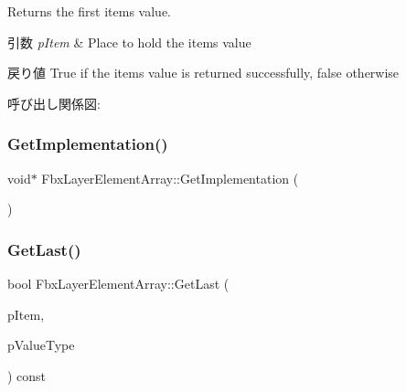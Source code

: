 Returns the first item\textquotesingle{}s value. 
\begin{DoxyParams}{引数}
{\em p\+Item} & Place to hold the item\textquotesingle{}s value \\
\hline
\end{DoxyParams}
\begin{DoxyReturn}{戻り値}
{\ttfamily True} if the item\textquotesingle{}s value is returned successfully, {\ttfamily false} otherwise 
\end{DoxyReturn}
呼び出し関係図\+:
\mbox{\label{class_fbx_layer_element_array_a3b8b773d91de7b18941884a208f90470}} 
\subsubsection{\texorpdfstring{Get\+Implementation()}{GetImplementation()}}
{\footnotesize\ttfamily void$\ast$ Fbx\+Layer\+Element\+Array\+::\+Get\+Implementation (\begin{DoxyParamCaption}{ }\end{DoxyParamCaption})\hspace{0.3cm}{\ttfamily [protected]}}

\mbox{\label{class_fbx_layer_element_array_a67aeb0dde8b3535d83dcf9eab97e78ae}} 
\subsubsection{\texorpdfstring{Get\+Last()}{GetLast()}\hspace{0.1cm}{\footnotesize\ttfamily [1/2]}}
{\footnotesize\ttfamily bool Fbx\+Layer\+Element\+Array\+::\+Get\+Last (\begin{DoxyParamCaption}\item[{void $\ast$$\ast$}]{p\+Item,  }\item[{\hyperlink{fbxpropertytypes_8h_a73913a5ddfb20e57c6f25e9e6784bd92}{E\+Fbx\+Type}}]{p\+Value\+Type }\end{DoxyParamCaption}) const}

